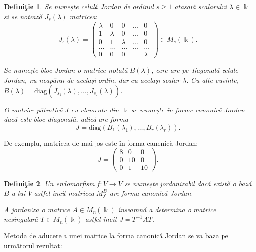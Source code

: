 \documentclass[11pt,a4paper]{article}
\theoremstyle{dotless}
\theoremstyle{dotlessdr}
\newtheorem{definition}{Defini\c{t}ie}[section]
\begin{document}
\begin{definition}\label{def:cel-j}
  Se numește \emph{celulă Jordan} de ordinul $s \geq 1$ atașată scalarului $\lambda \in \Bbbk$
  și se notează $J_s(\lambda)$ matricea:
  \[
    J_s(\lambda) =
    \begin{pmatrix}
      \lambda & 0 & 0 & \dots & 0 \\
      1 & \lambda & 0 & \dots & 0 \\
      0 & 1 & \lambda & \dots & 0 \\
      \dots & \dots & \dots & \dots & \dots \\
      0 & 0 & 0 & \dots & \lambda
    \end{pmatrix} \in M_s(\Bbbk).
  \]

  Se numește \emph{bloc Jordan} o matrice notată $B(\lambda)$, care are pe
  diagonală celule Jordan, nu neapărat de același ordin, dar cu același scalar $\lambda$.
  Cu alte cuvinte, $B(\lambda) = \mathrm{diag}(J_{s_1}(\lambda), \dots, J_{s_p}(\lambda))$.

  O matrice pătratică $J$ cu elemente din $\Bbbk$ se numește \emph{în forma canonică Jordan}
  dacă este bloc-diagonală, adică are forma
  \[
    J = \mathrm{diag}(B_1(\lambda_1), \dots, B_r(\lambda_r)).
  \]
\end{definition}

De exemplu, matricea de mai jos este în forma canonică Jordan:
\[
  J = \begin{pmatrix}
    8 & 0 & 0 \\
    0 & 10 & 0 \\
    0 & 1 & 10
  \end{pmatrix}.
\]

\begin{definition}\label{def:jordanizare}
  Un endomorfism $f : V \to V$ se numește \emph{jordanizabil} dacă există o bază $B$
  a lui $V$ astfel încît matricea $M_f^B$ are forma canonică Jordan.

  A jordaniza o matrice $A \in M_n(\Bbbk)$ înseamnă a determina o matrice nesingulară
  $T \in M_n(\Bbbk)$ astfel încît $J = T^{-1} AT$.
\end{definition}

Metoda de aducere a unei matrice la forma canonică Jordan se va baza pe următorul
rezultat:
\end{document}
